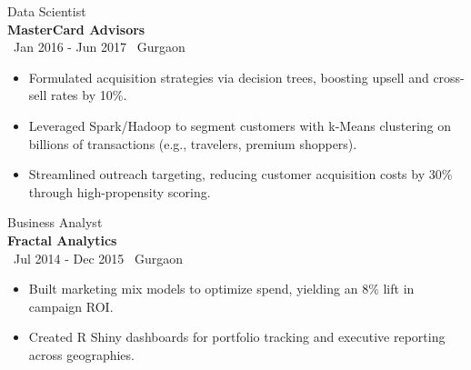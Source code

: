 {\large Data Scientist} \\
\textbf{MasterCard Advisors} \\
\faCalendar \, Jan 2016 - Jun 2017 \hfill \faMapMarker \, Gurgaon
\begin{itemize}[itemsep=1pt, topsep=0pt]
    \item Formulated acquisition strategies via decision trees, boosting upsell and cross-sell rates by 10\%.
    \item Leveraged Spark/Hadoop to segment customers with k-Means clustering on billions of transactions (e.g., travelers, premium shoppers).
    \item Streamlined outreach targeting, reducing customer acquisition costs by 30\% through high-propensity scoring.
\end{itemize}

{\large Business Analyst} \\
\textbf{Fractal Analytics} \\
\faCalendar \, Jul 2014 - Dec 2015 \hfill \faMapMarker \, Gurgaon
\begin{itemize}[itemsep=1pt, topsep=0pt]
    \item Built marketing mix models to optimize spend, yielding an 8\% lift in campaign ROI.
    \item Created R Shiny dashboards for portfolio tracking and executive reporting across geographies.
\end{itemize}